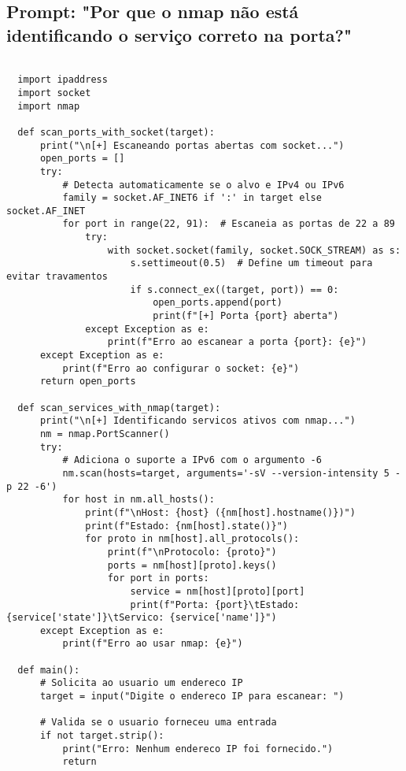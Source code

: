 \documentclass[12pt]{article}
\begin{document}
    
\subsection{\textbf{Prompt:} "Por que o nmap não está identificando o serviço correto na porta?"}
    \begin{lstlisting}
    
  import ipaddress
  import socket
  import nmap

  def scan_ports_with_socket(target):
      print("\n[+] Escaneando portas abertas com socket...")
      open_ports = []
      try:
          # Detecta automaticamente se o alvo e IPv4 ou IPv6
          family = socket.AF_INET6 if ':' in target else socket.AF_INET
          for port in range(22, 91):  # Escaneia as portas de 22 a 89
              try:
                  with socket.socket(family, socket.SOCK_STREAM) as s:
                      s.settimeout(0.5)  # Define um timeout para evitar travamentos
                      if s.connect_ex((target, port)) == 0:
                          open_ports.append(port)
                          print(f"[+] Porta {port} aberta")
              except Exception as e:
                  print(f"Erro ao escanear a porta {port}: {e}")
      except Exception as e:
          print(f"Erro ao configurar o socket: {e}")
      return open_ports

  def scan_services_with_nmap(target):
      print("\n[+] Identificando servicos ativos com nmap...")
      nm = nmap.PortScanner()
      try:
          # Adiciona o suporte a IPv6 com o argumento -6
          nm.scan(hosts=target, arguments='-sV --version-intensity 5 -p 22 -6')
          for host in nm.all_hosts():
              print(f"\nHost: {host} ({nm[host].hostname()})")
              print(f"Estado: {nm[host].state()}")
              for proto in nm[host].all_protocols():
                  print(f"\nProtocolo: {proto}")
                  ports = nm[host][proto].keys()
                  for port in ports:
                      service = nm[host][proto][port]
                      print(f"Porta: {port}\tEstado: {service['state']}\tServico: {service['name']}")
      except Exception as e:
          print(f"Erro ao usar nmap: {e}")

  def main():
      # Solicita ao usuario um endereco IP
      target = input("Digite o endereco IP para escanear: ")

      # Valida se o usuario forneceu uma entrada
      if not target.strip():
          print("Erro: Nenhum endereco IP foi fornecido.")
          return


\end{lstlisting}
\end{document}
